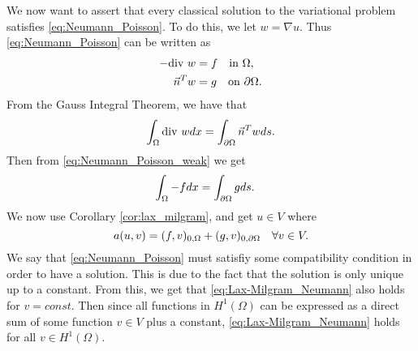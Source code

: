 We now want to assert that every classical solution to the variational problem satisfies \eqref{eq:Neumann_Poisson}.
To do this, we let $w=\nabla u$. Thus \eqref{eq:Neumann_Poisson} can be written as
\begin{align}\label{eq:Neumann_Poisson_weak}
\begin{split}
    -\text{div } w &= f \quad \text{in } \Omega, \\
    \vec{n}^Tw &= g \quad \text{on } \partial \Omega.
\end{split}    
\end{align}
From the Gauss Integral Theorem, we have that
\[\int_{\Omega} \text{div } w dx = \int_{\partial \Omega} \vec{n}^Tw ds.\]
Then from \eqref{eq:Neumann_Poisson_weak} we get
\begin{align}
\begin{split}
\int_{\Omega} -f dx &= \int_{\partial \Omega} g ds.
\end{split}
\end{align}
We now use Corollary \ref{cor:lax_milgram}, and get $u\in V$ where
\begin{equation}\label{eq:Lax-Milgram_Neumann}
  a(u,v) = (f,v)_{0,\Omega} + (g,v)_{0,\partial \Omega} \quad \forall v\in V.  
\end{equation}
We say that \eqref{eq:Neumann_Poisson} must satisfiy some compatibility condition in order to have a solution.
 This is due to the fact that the solution is only unique up to a constant.
  From this, we get that \ref{eq:Lax-Milgram_Neumann} also holds for $v=const$.
Then since all functions in $H^1(\Omega)$ can be expressed as a direct sum of some function $v\in V$ plus a constant, \eqref{eq:Lax-Milgram_Neumann} holds for all $v\in H^1(\Omega)$.